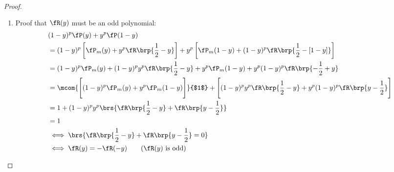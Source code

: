 \begin{proof}
\begin{enumerate}
\begin{enumerate}
        \item Proof that $\fR(y)$ must be an odd polynomial:
          \begin{align*}
            &(1-y)^p \fP(y) + y^p \fP(1-y)
            \\&= (1-y)^p \left[ \fP_m(y)   + y^p     \fR\brp{\frac{1}{2}-y} \right] +
                     y^p \left[ \fP_m(1-y) + (1-y)^p \fR\brp{\frac{1}{2}-[1-y]} \right]
            \\&= (1-y)^p \fP_m(y)   + (1-y)^p y^p \fR\brp{\frac{1}{2}-y} +
                     y^p \fP_m(1-y) + y^p (1-y)^p \fR\brp{-\frac{1}{2}+y}
            \\&= \mcom{\Bigg[(1-y)^p \fP_m(y) + y^p \fP_m(1-y) \Bigg]}{$1$}  +
                 \Bigg[(1-y)^p y^p \fR\brp{\frac{1}{2}-y} +
                        y^p (1-y)^p \fR\brp{y-\frac{1}{2}}
                 \Bigg]
            \\&= 1+ (1-y)^p y^p \brs{\fR\brp{\frac{1}{2}-y} + \fR\brp{y-\frac{1}{2}}}
            \\&= 1 
            \\&\iff \brs{\fR\brp{\frac{1}{2}-y} +\fR\brp{y-\frac{1}{2}}=0} 
            \\&\iff \fR(y)=-\fR(-y) \qquad\text{($\fR(y)$ is odd)}
          \end{align*}
    \end{enumerate}


\end{enumerate}
\end{proof}
